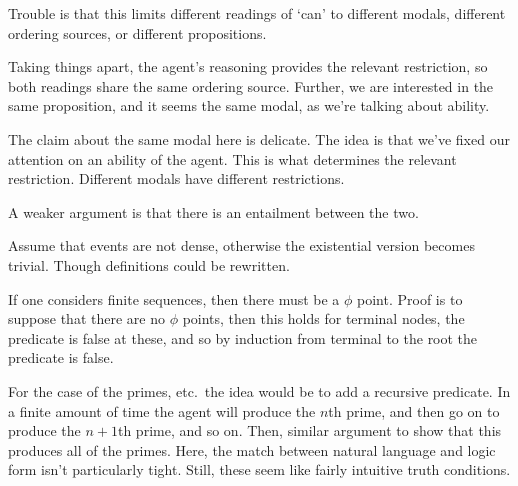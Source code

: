 \documentclass[10pt]{article}
\begin{document}
Trouble is that this limits different readings of `can' to different modals, different ordering sources, or different propositions.

Taking things apart, the agent's reasoning provides the relevant restriction, so both readings share the same ordering source.
Further, we are interested in the same proposition, and it seems the same modal, as we're talking about ability.

The claim about the same modal here is delicate.
The idea is that we've fixed our attention on an ability of the agent.
This is what determines the relevant restriction.
Different modals have different restrictions.

A weaker argument is that there is an entailment between the two.

Assume that events are not dense, otherwise the existential version becomes trivial.
Though definitions could be rewritten.

If one considers finite sequences, then there must be a \(\phi\) point.
Proof is to suppose that there are no \(\phi\) points, then this holds for terminal nodes, the predicate is false at these, and so by induction from terminal to the root the predicate is false.

For the case of the primes, etc.\ the idea would be to add a recursive predicate.
In a finite amount of time the agent will produce the \(n\)th prime, and then go on to produce the \(n+1\)th prime, and so on.
Then, similar argument to show that this produces all of the primes.
Here, the match between natural language and logic form isn't particularly tight.
Still, these seem like fairly intuitive truth conditions.
\end{document}
